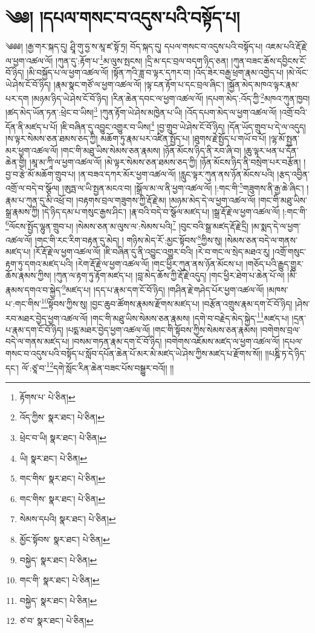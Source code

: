 \setcounter{footnote}{0} 
\chapter{༄༅། །དཔལ་གསང་བ་འདུས་པའི་བསྟོད་པ།}༄༅༅། །རྒྱ་གར་སྐད་དུ། ཤྲཱི་གུ་ཧྱ་ས་མཱ་ཛ་སྟོ་ཏྲ། བོད་སྐད་དུ། དཔལ་གསང་བ་འདུས་པའི་བསྟོད་པ། འཇམ་པའི་རྡོ་རྗེ་ལ་ཕྱག་འཚལ་ལོ། །ཀུན་དུ་:རྟོག་པ་\footnote{རྟོགས་པ་  པེ་ཅིན། }མ་ལུས་སྤངས། །དྲི་མ་དང་བྲལ་བདག་ཉིད་ཅན། །ཀུན་བཟང་ཆོས་དབྱིངས་ངོ་བོ་ཉིད། །མི་བསྐྱོད་པ་ལ་ཕྱག་འཚལ་ལོ། །སྟོན་ཀའི་ཟླ་བ་ལྟར་དཀར་བ། །འོད་ཟེར་བརྒྱ་ཕྲག་རྣམ་འགྱེད་པ། །མེ་ལོང་ཡེ་ཤེས་ངོ་བོ་ཉིད། །རྣམ་སྣང་གཙོ་ལ་ཕྱག་འཚལ་ལོ། །ལྟ་ངན་རྟོག་པ་དང་བྲལ་ཞིང་། །སྐྱོན་མེད་མཁའ་ལྟར་རྣམ་པར་དག །མཉམ་ཉིད་ཡེ་ཤེས་ངོ་བོ་ཉིད། །རིན་ཆེན་དབང་ལ་ཕྱག་འཚལ་ལོ། །དཔག་མེད་:འོད་ཀྱི་\footnote{འོད་ཀྱིས་  སྣར་ཐང་།  པེ་ཅིན། }མཁའ་ཀུན་ཁྱབ། །ཚད་མེད་ཡོན་ཏན་:ཕྲེང་བ་ཡིས།\footnote{ཕྲེང་བ་ཡི།  སྣར་ཐང་།  པེ་ཅིན། } །ཀུན་རྟོག་ཡེ་ཤེས་མཁྱེན་པ་ཡི། །འོད་དཔག་མེད་ལ་ཕྱག་འཚལ་ལོ། །འགྲོ་བའི་དོན་ནི་མཛད་པ་པོ། །ཇི་བཞིན་དུ་འབྱུང་འགྱུར་བ་ཡིས།\footnote{ཡི།  སྣར་ཐང་།  པེ་ཅིན། } །བྱ་གྲུབ་ཡེ་ཤེས་ངོ་བོ་ཉིད། །དོན་ཡོད་གྲུབ་པ་དེ་ལ་འདུད། །ས་ལྟར་སེམས་ཅན་ཐམས་ཅད་ཀྱི། མཆོག་ཏུ་རྣམ་པར་འཛིན་སྤྱོད་པ། །ཐུགས་རྗེ་སྤྱོད་པ་གཡོ་བ་པོ། །ལྷ་མོ་སྤྱན་མར་ཕྱག་འཚལ་ལོ། །གང་གི་མཐུ་ཡིས་སེམས་ཅན་རྣམས། །ཉོན་མོངས་ཉིད་ནི་རབ་ཞི་བ། །ཆུ་ལྟར་ཕན་པ་དོན་ཆེན་གྱི། །མཱ་མ་ཀཱི་ལ་ཕྱག་འཚལ་ལོ། །མེ་ལྟར་སེམས་ཅན་ཐམས་ཅད་ཀྱི། །ཉོན་མོངས་ཉིད་ནི་བསྲེག་པར་བརྩོན། །བྱ་བ་རྩེ་མོ་མཆོག་གྲུབ་པ། །ན་བཟའ་དཀར་མོར་ཕྱག་འཚལ་ལོ། །རླུང་ལྟར་ཀུན་ནས་ཉོན་མོངས་པའི། །རྩད་འབྱིན་འགྲོ་ལ་བདེ་བ་སྩོལ། །ཨུཏྤ་ལ་ཡི་སྤྱན་མངའ་བ། །སྒྲོལ་མ་ལ་ནི་ཕྱག་འཚལ་ལོ། །:གང་གི་\footnote{གང་གིས་  སྣར་ཐང་།  པེ་ཅིན། }གཟུགས་ནི་རྒྱ་ཆེ་ཞིང་། །རྣམ་པ་ཀུན་དུ་མི་འཕྲོ་བ། །བརྟགས་བྲལ་གཟུགས་ཀྱི་རྡོ་རྗེ་མ། །མཉམ་མེད་དེ་ལ་ཕྱག་འཚལ་ལོ། །གང་གི་མཐུ་ཡིས་སྒྲ་རྣམས་ཀྱི། །དེ་ཉིད་དམ་པ་གསུང་རྒྱས་ཤིང་། །རྣ་བའི་བདེ་བ་སྩོལ་མཛད་པ། །སྒྲ་རྡོ་རྗེ་ལ་ཕྱག་འཚལ་ལོ། །:གང་གི་\footnote{གང་གིས་  སྣར་ཐང་།  པེ་ཅིན། }ལོངས་སྤྱོད་ལྷུན་གྲུབ་པ། །སེམས་ཅན་མ་ལུས་ལ་:སེམས་པའི།\footnote{སེམས་དཔའི།  སྣར་ཐང་།  པེ་ཅིན། } །བུང་བའི་སྒྲ་མཛད་རྡོ་རྗེ་དྲི། །མ་སྨད་དེ་ལ་ཕྱག་འཚལ་ལོ། །གང་གི་རང་རིག་བརྟན་དུ་མེད། །
གཉིས་མེད་རོ་:མྱང་སྟོབས་\footnote{མྱོང་སྟོབས་  སྣར་ཐང་།  པེ་ཅིན། }ཀྱིས་སུ། །སེམས་ཅན་བདེ་ལ་གནས་མཛད་པ། །རོ་རྡོ་རྗེ་ལ་ཕྱག་འཚལ་ལོ། །ཇི་བཞིན་དུ་ནི་འབྱུང་འགྱུར་བའི། །རེ་བ་གང་ལ་སྲེད་མཐའ་རུ། །འགྲོ་གསུང་རྟག་ཏུ་དགའ་མཛད་པའི། །རེག་རྡོ་རྗེ་ལ་ཕྱག་འཚལ་ལོ། །གང་ཕྱིར་ཀུན་ནས་ཉོན་མོངས་པ། །གཅོད་པའི་རྒྱུད་གྱུར་ཆོས་རྣམས་ཀྱིས། །ཀུན་ལ་རྟག་ཏུ་རྟོག་མཛད་པ། །བླ་མེད་ཆོས་ཀྱི་རྡོ་རྗེ་འདུད། །གང་ཕྱིར་ཐེག་པ་ཆེན་པོ་ལ། །མི་རྣམས་དགའ་བ་སྐྱེད་\footnote{བསྐྱེད་  སྣར་ཐང་།  པེ་ཅིན། }མཛད་པ། །དད་པ་རྣམ་དག་ངོ་བོ་ཉིད། །གཤིན་རྗེ་གཤེད་པོར་ཕྱག་འཚལ་ལོ། །མཁས་པ་:གང་གིས་\footnote{གང་གི་  སྣར་ཐང་།  པེ་ཅིན། }སྟོབས་ཀྱིས་སུ། །བྱང་ཆུབ་ཚོགས་རྣམས་རྫོགས་མཛད་པ། །བརྩོན་འགྲུས་རྣམ་དག་ངོ་བོ་ཉིད། །ཤེས་རབ་མཐར་བྱེད་ཕྱག་འཚལ་ལོ། །གང་གི་མཐུ་ཡིས་སེམས་ཅན་རྣམས། །དགེ་བ་བརྗེད་མེད་སྐྱེད་\footnote{བསྐྱེད་  སྣར་ཐང་།  པེ་ཅིན། }མཛད་པ། །དྲན་པ་རྣམ་དག་ངོ་བོ་ཉིད། །པདྨ་མཐར་བྱེད་ཕྱག་འཚལ་ལོ། །གང་གི་སྟོབས་ཀྱིས་སེམས་ཅན་རྣམས། །བགེགས་བྲལ་བདེ་ལ་གནས་མཛད་པ། །བསམ་གཏན་རྣམ་དག་ངོ་བོ་ཉིད། །བགེགས་འཇོམས་མཛད་ལ་ཕྱག་འཚལ་ལོ། །དཔལ་གསང་བ་འདུས་པའི་བསྟོད་པ་སློབ་དཔོན་ཆེན་པོ་མར་མེ་མཛད་ཡེ་ཤེས་ཀྱིས་མཛད་པ་རྫོགས་སོ།། །།པཎྜི་ཏ་དེ་ཉིད་དང་། ལོ་:ཙཱ་བ་\footnote{ཙ་བ་  སྣར་ཐང་།  པེ་ཅིན། }དགེ་སློང་རིན་ཆེན་བཟང་པོས་བསྒྱུར་བའོ།། །།